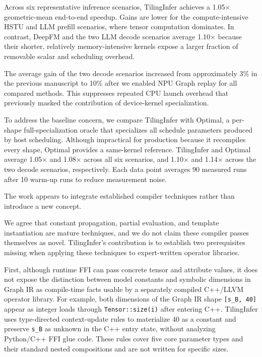 \authorresponse
Across six representative inference scenarios, TilingInfer achieves a
1.05$\times$ geometric-mean end-to-end speedup. Gains are lower for the
compute-intensive HSTU and LLM prefill scenarios, where tensor computation
dominates. In contrast, DeepFM and the two LLM decode scenarios average
1.10$\times$ because their shorter, relatively memory-intensive kernels expose
a larger fraction of removable scalar and scheduling overhead.

The average gain of the two decode scenarios increased from approximately 3\%
in the previous manuscript to 10\% after we enabled NPU Graph replay for all
compared methods. This suppresses repeated CPU launch overhead that previously
masked the contribution of device-kernel specialization.

To address the baseline concern, we compare TilingInfer with Optimal, a
per-shape full-specialization oracle that specializes all schedule parameters
produced by host scheduling. Although impractical for production because it
recompiles every shape, Optimal provides a same-kernel reference. TilingInfer
and Optimal average 1.05$\times$ and 1.08$\times$ across all six scenarios,
and 1.10$\times$ and 1.14$\times$ across the two decode scenarios,
respectively. Each data point averages 90 measured runs after 10 warm-up runs
to reduce measurement noise.


{The work appears to integrate established compiler techniques rather than
introduce a new concept.}

\authorresponse
We agree that constant propagation, partial evaluation, and template
instantiation are mature techniques, and we do not claim these compiler passes
themselves as novel.  TilingInfer's contribution is to establish two
prerequisites missing when applying these techniques to expert-written
operator libraries.

First, although runtime FFI can pass concrete tensor and attribute values, it
does not expose the distinction between model constants and symbolic dimensions
in Graph IR as compile-time facts usable by a separately compiled C++/LLVM
operator library.  For example, both dimensions of the Graph IR shape
\texttt{[s\_B, 40]} appear as integer loads through
\texttt{Tensor::size(i)} after entering C++.  TilingInfer uses type-directed
context-update rules to materialize 40 as a constant and preserve
\texttt{s\_B} as unknown in the C++ entry state, without analyzing Python/C++
FFI glue code.  These rules cover five core parameter types and their standard
nested compositions and are not written for specific sizes.

